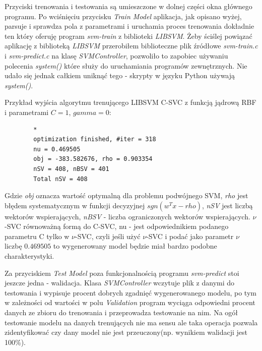 \documentclass[paper=a4, fontsize=11pt]{scrartcl} %
\numberwithin{equation}{section} %
\numberwithin{figure}{section} %
\begin{document}
    \par Przyciski trenowania i testowania są umieszczone w dolnej części okna głównego
    programu. Po wciśnięciu przycisku \textit{Train Model} aplikacja, jak opisano wyżej,
    parsuje i sprawdza pola z parametrami i uruchamia proces trenowania dokładnie ten który
    oferuję program \textit{svm-train} z biblioteki \textit{LIBSVM}. Żeby ściślej powiązać
    aplikację z biblioteką \textit{LIBSVM} przerobiłem biblioteczne plik źródłowe
    \textit{svm-train.c} i \textit{svm-predict.c} na klasę \textit{SVMController}, pozwoliło to
    zapobiec używaniu polecenia \textit{system()} które służy do uruchamiania programów
    zewnętrznych. Nie udało się jednak całkiem uniknąć tego - skrypty w języku Python używają
    \textit{system()}.

    \newpage
    Przykład wyjścia algorytmu trenującego LIBSVM C-SVC z funkcją jądrową RBF i parametrami
    $C=1$, $gamma=0$:

    \begin{verbatim}
        *
        optimization finished, #iter = 318
        nu = 0.469505
        obj = -383.582676, rho = 0.903354
        nSV = 408, nBSV = 401
        Total nSV = 408
    \end{verbatim}

    \par Gdzie \textit{obj} oznacza wartość optymalną dla problemu podwójnego SVM, \textit{rho}
    jest błędem systematycznym w funkcji decyzyjnej $sgn(w^{T}x - rho)$, \textit{nSV} jest
    liczbą wektorów wspierających, \textit{nBSV} - liczba ograniczonych  wektorów
    wspierających. $\nu$-SVC równoważną formą do C-SVC, nu - jest odpowiednikiem podanego
    parametru C tylko w $\nu$-SVC, czyli jeśli użyć $\nu$-SVC i podać jako parametr $\nu$
    liczbę $0.469505$ to wygenerowany model będzie miał bardzo podobne charakterystyki.

    \par Za przyciskiem \textit{Test Model} poza funkcjonalnością programu \textit{svm-predict}
    stoi jeszcze jedna - walidacja. Klasa \textit{SVMController} wczytuje plik z danymi do
    testowania i wypisuje procent dobrych zgadnięć wygenerowanego modelu, po tym w zależności
    od wartości w polu \textit{Validation} program wyciąga odpowiedni procent danych ze zbioru
    do trenowania i przeprowadza testowanie na nim. Na ogół testowanie modelu na danych
    trenujących nie ma sensu ale taka operacja pozwala zidentyfikować czy dany model nie jest
    przeuczony(np. wynikiem walidacji jest 100\%). \\
\end{document}
